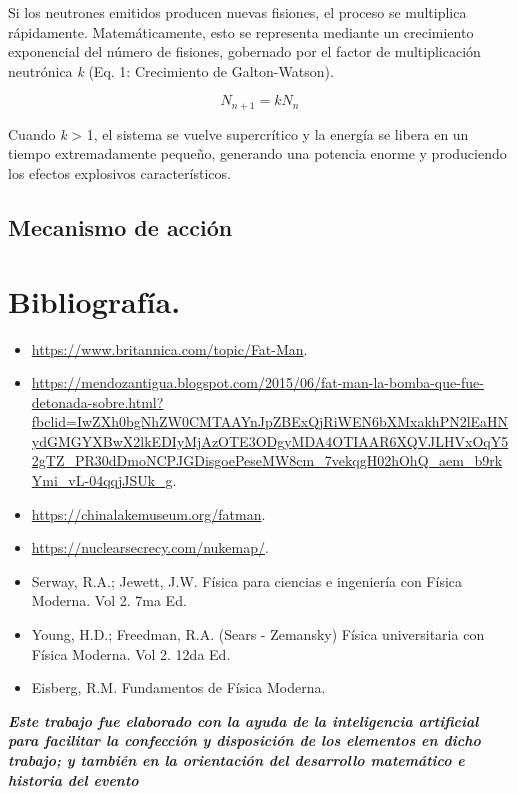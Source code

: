 \documentclass[12pt,a4paper]{article}
\begin{document}
    Si los neutrones emitidos producen nuevas fisiones, el proceso se multiplica rápidamente. Matemáticamente, esto se representa mediante un crecimiento exponencial del número de fisiones, gobernado por el factor de multiplicación neutrónica \textit{k} (Eq. 1: Crecimiento de Galton-Watson).
    
    \begin{equation} \label{eq:placeholder_label}
    N_{n+1} = k N_n
    \end{equation}
    
    Cuando \textit{k} > 1, el sistema se vuelve supercrítico y la energía se libera en un tiempo extremadamente pequeño, generando una potencia enorme y produciendo los efectos explosivos característicos.
\subsection{Mecanismo de acción}
    

\section{Bibliografía.}

\begin{itemize}
    \item \url{https://www.britannica.com/topic/Fat-Man}.
    \item \url{https://mendozantigua.blogspot.com/2015/06/fat-man-la-bomba-que-fue-detonada-sobre.html?fbclid=IwZXh0bgNhZW0CMTAAYnJpZBExQjRiWEN6bXMxakhPN2lEaHNydGMGYXBwX2lkEDIyMjAzOTE3ODgyMDA4OTIAAR6XQVJLHVxOqY52gTZ_PR30dDmoNCPJGDisgoePeseMW8cm_7vekqgH02hOhQ_aem_b9rkYmi_vL-04qqjJSUk_g}.
    \item \url{https://chinalakemuseum.org/fatman}.
    \item \url{https://nuclearsecrecy.com/nukemap/}.
    \item Serway, R.A.; Jewett, J.W. Física para ciencias e ingeniería con Física Moderna. Vol 2. 7ma Ed.
    \item Young, H.D.; Freedman, R.A. (Sears - Zemansky) Física universitaria con Física Moderna. Vol 2. 12da Ed.
    \item Eisberg, R.M. Fundamentos de Física Moderna.
\end{itemize}

\vfill
\textit{\textbf{Este trabajo fue elaborado con la ayuda de la inteligencia artificial para facilitar la confección y disposición de los elementos en dicho trabajo; y también en la orientación del desarrollo matemático e historia del evento}}
\end{document}
